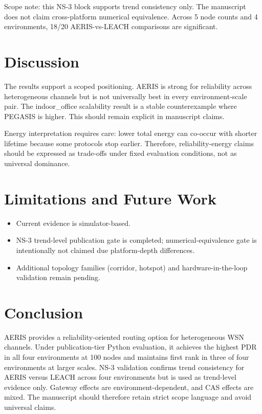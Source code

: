 \documentclass[sensors,article,submit,moreauthors,pdftex]{Definitions/mdpi}
\begin{document}
Scope note: this NS-3 block supports trend consistency only. The manuscript does not claim cross-platform numerical equivalence. Across 5 node counts and 4 environments, 18/20 AERIS-vs-LEACH comparisons are significant.

\section{Discussion}
The results support a scoped positioning. AERIS is strong for reliability across heterogeneous channels but is not universally best in every environment-scale pair. The indoor\_office scalability result is a stable counterexample where PEGASIS is higher. This should remain explicit in manuscript claims.

Energy interpretation requires care: lower total energy can co-occur with shorter lifetime because some protocols stop earlier. Therefore, reliability-energy claims should be expressed as trade-offs under fixed evaluation conditions, not as universal dominance.

\section{Limitations and Future Work}
\begin{itemize}
\item Current evidence is simulator-based.
\item NS-3 trend-level publication gate is completed; numerical-equivalence gate is intentionally not claimed due platform-depth differences.
\item Additional topology families (corridor, hotspot) and hardware-in-the-loop validation remain pending.
\end{itemize}

\section{Conclusion}
AERIS provides a reliability-oriented routing option for heterogeneous WSN channels. Under publication-tier Python evaluation, it achieves the highest PDR in all four environments at 100 nodes and maintains first rank in three of four environments at larger scales. NS-3 validation confirms trend consistency for AERIS versus LEACH across four environments but is used as trend-level evidence only. Gateway effects are environment-dependent, and CAS effects are mixed. The manuscript should therefore retain strict scope language and avoid universal claims.

\end{document}
